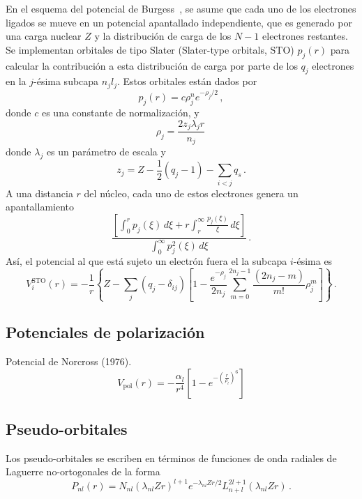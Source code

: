 En el esquema del potencial de Burgess~\cite{Burgess:89}, se asume que 
cada uno de los electrones ligados se mueve en un potencial apantallado 
independiente, que es generado por una carga nuclear $Z$ y la 
distribución de carga de los $N-1$ electrones restantes. Se implementan 
orbitales de tipo Slater (Slater-type orbitals, STO) $p_j(r)$ para 
calcular la contribución a esta distribución de carga por parte de los 
$q_j$ electrones en la $j$-ésima subcapa $n_jl_j$. Estos orbitales están 
dados por
\begin{equation}
p_j(r) = c\rho_j^n e^{-\rho_j/2}\,,
\end{equation}
donde $c$ es una constante de normalización, y 
\begin{equation}
\rho_j= \frac{2z_j\lambda_jr}{n_j}\,
\end{equation}
donde $\lambda_j$ es un parámetro de escala y 
\begin{equation}
z_j=Z-\frac{1}{2}\left(q_j-1\right)-\sum_{i<j} q_s\,.
\end{equation}
A una distancia $r$ del núcleo, cada uno de estos electrones genera un 
apantallamiento 
\begin{equation}
\frac{\left[\int_0^r p_j(\xi)\,d\xi +r\int_r^{\infty}
\frac{p_j(\xi)}{\xi}\,d\xi\right]}{\int_0^{\infty}p_j^2(\xi)\,d\xi}\,.
\end{equation}
Así, el potencial al que está sujeto un electrón fuera el la subcapa 
$i$-ésima es
\begin{equation}
V_i^{\textrm{STO}}(r)=-\frac{1}{r}\left\{Z-\sum_j(q_j-\delta_{ij})\left[1-
\frac{e^{-\rho_j}}{2n_j}\sum_{m=0}^{2n_j-1}\frac{(2n_j-m)}{m!}\rho_j^m
\right]\right\}\,.
\end{equation}




\subsection{Potenciales de polarización}

Potencial de Norcross (1976).
\begin{equation*}
 V_{\textrm{pol}}(r) = -\frac{\alpha_l}{r^4}\left[1-e^{-\left(\tfrac{r}{\rho_l}\right)^6}\right]
\end{equation*}

\subsection{Pseudo-orbitales}

Los pseudo-orbitales se escriben en términos de funciones de onda 
radiales de Laguerre no-ortogonales de la forma
\begin{equation}
P_{nl}(r) = N_{nl}(\lambda_{nl}Zr)^{l+1} e^{-\lambda_{nl}Zr/2} 
L_{n+l}^{2l+1}(\lambda_{nl}Zr)\,.
\label{eq:pseudo}
\end{equation}

